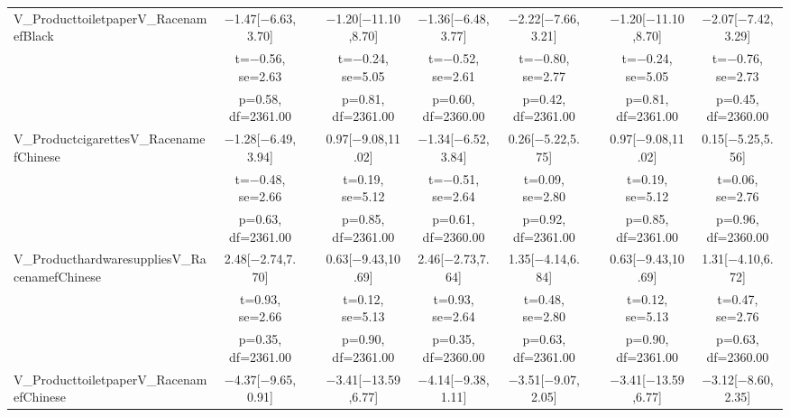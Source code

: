 \documentclass[]{report}
\begin{document}
\begin{table}
{\begin{tabular}[t]{lcccccccc}
		V\_ProducttoiletpaperV\_RacenamefBlack & \num{-1.47}[\num{-6.63},\num{3.70}] &  & \num{-1.20}[\num{-11.10},\num{8.70}] & \num{-1.36}[\num{-6.48},\num{3.77}] & \num{-2.22}[\num{-7.66},\num{3.21}] &  & \num{-1.20}[\num{-11.10},\num{8.70}] & \num{-2.07}[\num{-7.42},\num{3.29}]\\
		& t=\num{-0.56}, se=\num{2.63} &  & t=\num{-0.24}, se=\num{5.05} & t=\num{-0.52}, se=\num{2.61} & t=\num{-0.80}, se=\num{2.77} &  & t=\num{-0.24}, se=\num{5.05} & t=\num{-0.76}, se=\num{2.73}\\
		& p=\num{0.58}, df=\num{2361.00} &  & p=\num{0.81}, df=\num{2361.00} & p=\num{0.60}, df=\num{2360.00} & p=\num{0.42}, df=\num{2361.00} &  & p=\num{0.81}, df=\num{2361.00} & p=\num{0.45}, df=\num{2360.00}\\
		V\_ProductcigarettesV\_RacenamefChinese & \num{-1.28}[\num{-6.49},\num{3.94}] &  & \num{0.97}[\num{-9.08},\num{11.02}] & \num{-1.34}[\num{-6.52},\num{3.84}] & \num{0.26}[\num{-5.22},\num{5.75}] &  & \num{0.97}[\num{-9.08},\num{11.02}] & \num{0.15}[\num{-5.25},\num{5.56}]\\
		& t=\num{-0.48}, se=\num{2.66} &  & t=\num{0.19}, se=\num{5.12} & t=\num{-0.51}, se=\num{2.64} & t=\num{0.09}, se=\num{2.80} &  & t=\num{0.19}, se=\num{5.12} & t=\num{0.06}, se=\num{2.76}\\
		& p=\num{0.63}, df=\num{2361.00} &  & p=\num{0.85}, df=\num{2361.00} & p=\num{0.61}, df=\num{2360.00} & p=\num{0.92}, df=\num{2361.00} &  & p=\num{0.85}, df=\num{2361.00} & p=\num{0.96}, df=\num{2360.00}\\
		V\_ProducthardwaresuppliesV\_RacenamefChinese & \num{2.48}[\num{-2.74},\num{7.70}] &  & \num{0.63}[\num{-9.43},\num{10.69}] & \num{2.46}[\num{-2.73},\num{7.64}] & \num{1.35}[\num{-4.14},\num{6.84}] &  & \num{0.63}[\num{-9.43},\num{10.69}] & \num{1.31}[\num{-4.10},\num{6.72}]\\
		& t=\num{0.93}, se=\num{2.66} &  & t=\num{0.12}, se=\num{5.13} & t=\num{0.93}, se=\num{2.64} & t=\num{0.48}, se=\num{2.80} &  & t=\num{0.12}, se=\num{5.13} & t=\num{0.47}, se=\num{2.76}\\
		& p=\num{0.35}, df=\num{2361.00} &  & p=\num{0.90}, df=\num{2361.00} & p=\num{0.35}, df=\num{2360.00} & p=\num{0.63}, df=\num{2361.00} &  & p=\num{0.90}, df=\num{2361.00} & p=\num{0.63}, df=\num{2360.00}\\
		V\_ProducttoiletpaperV\_RacenamefChinese & \num{-4.37}[\num{-9.65},\num{0.91}] &  & \num{-3.41}[\num{-13.59},\num{6.77}] & \num{-4.14}[\num{-9.38},\num{1.11}] & \num{-3.51}[\num{-9.07},\num{2.05}] &  & \num{-3.41}[\num{-13.59},\num{6.77}] & \num{-3.12}[\num{-8.60},\num{2.35}]\\

\end{tabular}}
\end{table}
\end{document}
